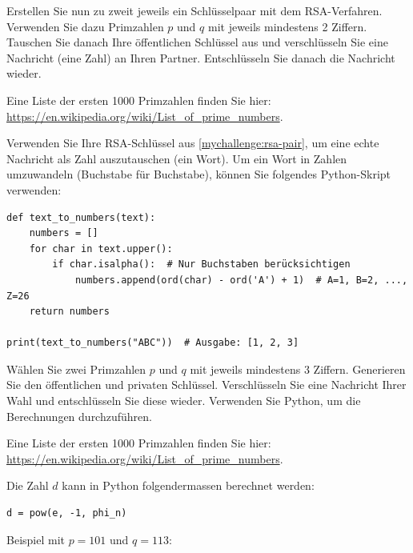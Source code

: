 \begin{mychallenge}\label{mychallenge:rsa-pair}
 Erstellen Sie nun zu zweit jeweils ein Schlüsselpaar mit dem \gls{RSA}-Verfahren. Verwenden Sie dazu Primzahlen \( p \) und \( q \) mit jeweils mindestens 2 Ziffern. Tauschen Sie danach Ihre öffentlichen Schlüssel aus und verschlüsseln Sie eine Nachricht (eine Zahl) an Ihren Partner. Entschlüsseln Sie danach die Nachricht wieder.

 Eine Liste der ersten 1000 Primzahlen finden Sie hier: \url{https://en.wikipedia.org/wiki/List_of_prime_numbers}.
\end{mychallenge}

\begin{mychallenge}
Verwenden Sie Ihre \gls{RSA}-Schlüssel aus \cref{mychallenge:rsa-pair}, um eine echte Nachricht als Zahl auszutauschen (ein Wort). Um ein Wort in Zahlen umzuwandeln (Buchstabe für Buchstabe), können Sie folgendes Python-Skript verwenden:
\begin{lstlisting}
def text_to_numbers(text):
	numbers = []
	for char in text.upper():
		if char.isalpha():  # Nur Buchstaben berücksichtigen
			numbers.append(ord(char) - ord('A') + 1)  # A=1, B=2, ..., Z=26
	return numbers

print(text_to_numbers("ABC"))  # Ausgabe: [1, 2, 3]
\end{lstlisting}
\end{mychallenge}

\begin{mychallenge}
	Wählen Sie zwei Primzahlen \( p \) und \( q \) mit jeweils mindestens 3 Ziffern. Generieren Sie den öffentlichen und privaten Schlüssel. Verschlüsseln Sie eine Nachricht Ihrer Wahl und entschlüsseln Sie diese wieder. Verwenden Sie Python, um die Berechnungen durchzuführen.

	Eine Liste der ersten 1000 Primzahlen finden Sie hier: \url{https://en.wikipedia.org/wiki/List_of_prime_numbers}.

	Die Zahl $d$ kann in Python folgendermassen berechnet werden:
	\begin{lstlisting}
d = pow(e, -1, phi_n)
	\end{lstlisting}
	\begin{myanswer}
		Beispiel mit \( p = 101 \) und \( q = 113 \):
		
	\end{myanswer}
\end{mychallenge}

